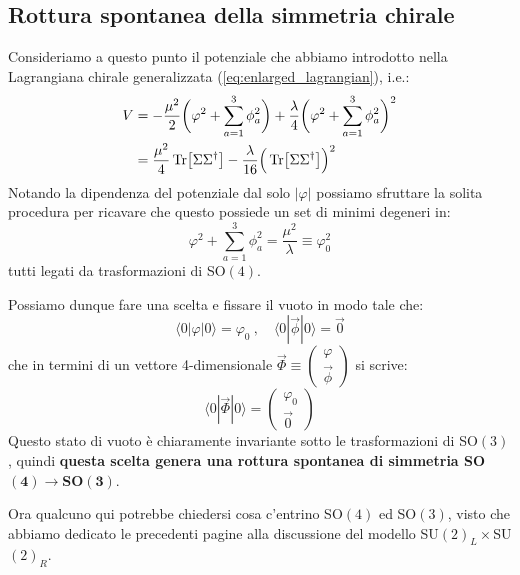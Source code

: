 \documentclass[../main.tex]{subfiles}
\begin{document}
\subsection{Rottura spontanea della simmetria chirale}

Consideriamo a questo punto il potenziale che abbiamo introdotto nella Lagrangiana chirale generalizzata (\ref{eq:enlarged_lagrangian}), i.e.:
\begin{equation}
    \begin{aligned}
        V &= - \frac{\mu^2}{2}\bigg(\varphi^2 + \sum_{a=1}^3\phi_a^2\bigg) + \frac{\lambda}{4}\bigg(\varphi^2 + \sum_{a=1}^3\phi_a^2\bigg)^2\\
        &=\frac{\mu^2}{4}\Tr[\Sigma\Sigma^\dagger] -\frac{\lambda}{16}\Big(\Tr[\Sigma\Sigma^\dagger]\Big)^2
    \end{aligned}
    \label{eq:chiral_potential}
\end{equation}
Notando la dipendenza del potenziale dal solo $|\varphi|$ possiamo sfruttare la solita procedura per ricavare che questo possiede un set di minimi degeneri in:
\[
\varphi^2 + \sum_{a=1}^3\phi_a^2 = \frac{\mu^2}{\lambda} \equiv \varphi_0^2
\]
tutti legati da trasformazioni di SO$(4)$.

Possiamo dunque fare una scelta e fissare il vuoto in modo tale che:
\[
\langle0|\varphi|0\rangle = \varphi_0~,\quad\langle0|\Vec\phi|0\rangle=\Vec{0}
\]
che in termini di un vettore 4-dimensionale $\Vec\Phi \equiv \begin{pmatrix}\varphi \\ \Vec{\phi}\end{pmatrix}$ si scrive:
\begin{equation}
    \langle0|\Vec\Phi|0\rangle = \begin{pmatrix}\varphi_0 \\ \Vec{0}\end{pmatrix}
    \label{eq:vacuum_choice_chiral}
\end{equation}
Questo stato di vuoto è chiaramente invariante sotto le trasformazioni di SO$(3)$, quindi \textbf{questa scelta genera una rottura spontanea di simmetria SO$\mathbf{(4)}\rightarrow$SO$\mathbf{(3)}$}.

Ora qualcuno qui potrebbe chiedersi cosa c'entrino SO$(4)$ ed SO$(3)$, visto che abbiamo dedicato le precedenti pagine alla discussione del modello SU$(2)_L\times$SU$(2)_R$. 
\end{document}

